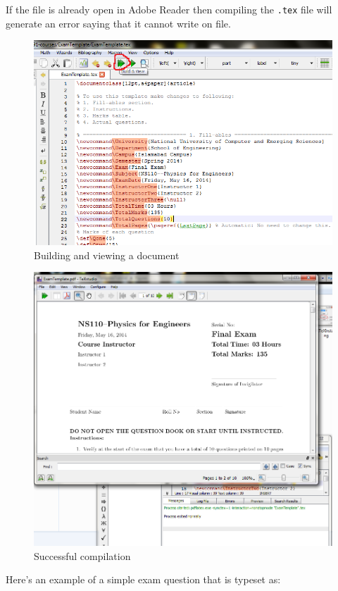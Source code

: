 \documentclass[12pt,a4paper]{article}
\begin{document}
If the file is already open in Adobe Reader then compiling the \verb|.tex| file will generate an error saying that it cannot write on file.
\begin{figure}[h]
\centering
\includegraphics[scale=0.675]{BuildandView.png}
\caption{Building and viewing a document}
\label{build-and-view}
\end{figure}
\begin{figure}[h]
\centering
\includegraphics[scale=0.6]{Compiled.png}
\caption{Successful compilation}
\label{compiled}
\end{figure}
Here's an example of a simple exam question that is typeset as:
\end{document}
